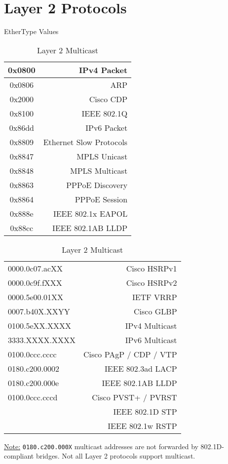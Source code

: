 \documentclass[12pt]{article}
\newif\ifcolor											%
\newcommand{\note}[1]{\ifcolor \colorbox{#1}{Note:}\else \underline{Note:}\fi}
\newcommand{\mr}[2]{\multirow{#1}{*}{#2}}
\begin{document}
\section{Layer 2 Protocols \label{sec:L2}}
	\begin{table}[H]
	\begin{minipage}[t]{.4\linewidth}
	\centering
	\caption{EtherType Values \label{tab:ETHERTYPE}}
	\begin{tabular}{| >{\ttfamily}c | r |}\hline
	0x0800	& IPv4 Packet\\\hline
	0x0806	& ARP\\\hline
	0x2000	& Cisco CDP\\\hline
	0x8100	& IEEE 802.1Q\\\hline
	0x86dd	& IPv6 Packet\\\hline
	0x8809	& Ethernet Slow Protocols\\\hline
	0x8847	& MPLS Unicast\\
	0x8848	& MPLS Multicast\\\hline
	0x8863	& PPPoE Discovery\\
	0x8864	& PPPoE Session\\\hline
	0x888e	& IEEE 802.1x EAPOL\\\hline
	0x88cc	& IEEE 802.1AB LLDP\\\hline
	\end{tabular}\end{minipage}\hfill
	\begin{minipage}[t]{.6\linewidth}
	\centering
	\caption{Layer 2 Multicast \label{tab:MULTICAST L2}}
	\begin{tabular}{| >{\ttfamily}l | r |}\hline
	0000.0c07.acXX		& Cisco HSRPv1\\
	0000.0c9f.fXXX		& Cisco HSRPv2\\\hline
	0000.5e00.01XX 		& IETF VRRP\\\hline
	0007.b40X.XXYY		& Cisco GLBP\\\hline
	0100.5eXX.XXXX		& IPv4 Multicast\\
	3333.XXXX.XXXX		& IPv6 Multicast\\\hline
	0100.0ccc.cccc	 	& Cisco PAgP / CDP / VTP\\\hline
	0180.c200.0002		& IEEE 802.3ad LACP\\\hline
	0180.c200.000e	 	& IEEE 802.1AB LLDP\\\hline
	0100.0ccc.cccd		& Cisco PVST+ / PVRST\\\hline
	\mr{2}{0180.c200.0000}	& IEEE 802.1D STP\\
					& IEEE 802.1w RSTP\\\hline
	\end{tabular}\end{minipage}\end{table}
	\note{Goldenrod} \texttt{0180.c200.000X} multicast addresses are not forwarded by 802.1D-compliant bridges. Not all Layer 2 protocols support multicast.
\end{document}
